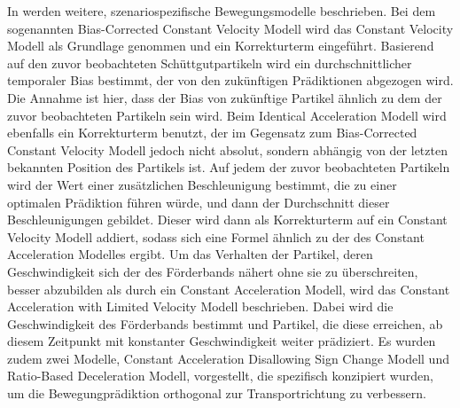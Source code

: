In \cite{Pfaff2018} werden weitere, szenariospezifische Bewegungsmodelle beschrieben.
Bei dem sogenannten Bias-Corrected Constant Velocity Modell wird das Constant Velocity Modell als Grundlage genommen und ein Korrekturterm eingeführt.
Basierend auf den zuvor beobachteten Schüttgutpartikeln wird ein durchschnittlicher temporaler Bias bestimmt, der von den zukünftigen Prädiktionen abgezogen wird.
Die Annahme ist hier, dass der Bias von zukünftige Partikel ähnlich zu dem der zuvor beobachteten Partikeln sein wird.
Beim Identical Acceleration Modell wird ebenfalls ein Korrekturterm benutzt, 
der im Gegensatz zum Bias-Corrected Constant Velocity Modell jedoch nicht absolut, sondern abhängig von der letzten bekannten Position des Partikels ist.
Auf jedem der zuvor beobachteten Partikeln wird der Wert einer zusätzlichen Beschleunigung bestimmt, die zu einer optimalen Prädiktion führen würde,
und dann der Durchschnitt dieser Beschleunigungen gebildet.
Dieser wird dann als Korrekturterm auf ein Constant Velocity Modell addiert, sodass sich eine Formel ähnlich zu der des Constant Acceleration Modelles ergibt.
Um das Verhalten der Partikel, deren Geschwindigkeit sich der des Förderbands nähert ohne sie zu überschreiten, besser abzubilden als durch ein Constant Acceleration Modell,
wird das Constant Acceleration with Limited Velocity Modell beschrieben. 
Dabei wird die Geschwindigkeit des Förderbands bestimmt und Partikel, die diese erreichen, ab diesem Zeitpunkt mit konstanter Geschwindigkeit weiter prädiziert.
Es wurden zudem zwei Modelle, Constant Acceleration Disallowing Sign Change Modell und Ratio-Based Deceleration Modell, vorgestellt, 
die spezifisch konzipiert wurden, um die Bewegungprädiktion orthogonal zur Transportrichtung zu verbessern.

